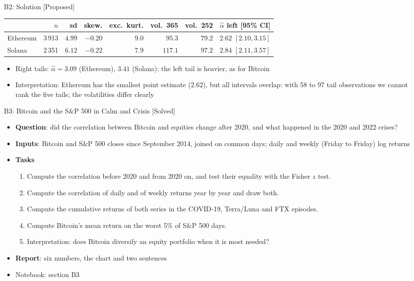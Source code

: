 \ifsolutions
\begin{frame}{B2: Solution [Proposed]}
\itemsize{\footnotesize}
\begin{center}
\scriptsize
\begin{tabular}{lrrrrrrr}
\toprule
& $n$ & sd & skew. & exc.\ kurt. & vol.\ 365 & vol.\ 252 & $\hat\alpha$ left [95\% CI] \\
\midrule
Ethereum & 3\,913 & $4.99$ & $-0.20$ & $9.0$ & $95.3$ & $79.2$ & $2.62$ $[2.10, 3.15]$ \\
Solana & 2\,351 & $6.12$ & $-0.22$ & $7.9$ & $117.1$ & $97.2$ & $2.84$ $[2.11, 3.57]$ \\
\bottomrule
\end{tabular}
\end{center}
\begin{itemize}
    \item Right tails: $\hat\alpha = 3.09$ (Ethereum), $3.41$ (Solana): the left tail is heavier, as for Bitcoin
    \item Interpretation: Ethereum has the smallest point estimate ($2.62$), but all intervals overlap: with 58 to 97 tail observations we cannot rank the five tails; the volatilities differ clearly
\end{itemize}
\end{frame}
\fi

\begin{frame}{B3: Bitcoin and the S\&P 500 in Calm and Crisis [Solved]}
\itemsize{\footnotesize}
\begin{itemize}
\item \textbf{Question}: did the correlation between Bitcoin and equities change after 2020, and what happened in the 2020 and 2022 crises?
\item \textbf{Inputs}: Bitcoin and S\&P 500 closes since September 2014, joined on common days; daily and weekly (Friday to Friday) log returns
\item \textbf{Tasks}
\begin{enumerate}
    \item Compute the correlation before 2020 and from 2020 on, and test their equality with the Fisher $z$ test.
    \item Compute the correlation of daily and of weekly returns year by year and draw both.
    \item Compute the cumulative returns of both series in the COVID-19, Terra/Luna and FTX episodes.
    \item Compute Bitcoin's mean return on the worst 5\% of S\&P 500 days.
    \item Interpretation: does Bitcoin diversify an equity portfolio when it is most needed?
\end{enumerate}
\item \textbf{Report}: six numbers, the chart and two sentences
\item Notebook: section B3
\end{itemize}
\end{frame}

